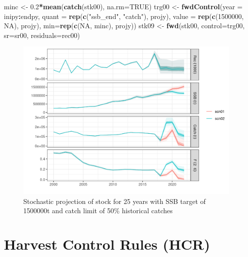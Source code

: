 \documentclass[
]{book}
\newenvironment{Shaded}{\begin{snugshade}}{\end{snugshade}}
\newcommand{\AttributeTok}[1]{\textcolor[rgb]{0.13,0.29,0.53}{#1}}
\newcommand{\ConstantTok}[1]{\textcolor[rgb]{0.56,0.35,0.01}{#1}}
\newcommand{\DecValTok}[1]{\textcolor[rgb]{0.00,0.00,0.81}{#1}}
\newcommand{\FloatTok}[1]{\textcolor[rgb]{0.00,0.00,0.81}{#1}}
\newcommand{\FunctionTok}[1]{\textcolor[rgb]{0.13,0.29,0.53}{\textbf{#1}}}
\newcommand{\NormalTok}[1]{#1}
\newcommand{\OtherTok}[1]{\textcolor[rgb]{0.56,0.35,0.01}{#1}}
\newcommand{\SpecialCharTok}[1]{\textcolor[rgb]{0.81,0.36,0.00}{\textbf{#1}}}
\newcommand{\StringTok}[1]{\textcolor[rgb]{0.31,0.60,0.02}{#1}}
\begin{document}
\begin{Shaded}
\begin{Highlighting}[]
\NormalTok{minc }\OtherTok{\textless{}{-}} \FloatTok{0.2}\SpecialCharTok{*}\FunctionTok{mean}\NormalTok{(}\FunctionTok{catch}\NormalTok{(stk00), }\AttributeTok{na.rm=}\ConstantTok{TRUE}\NormalTok{)}
\NormalTok{trg00 }\OtherTok{\textless{}{-}} \FunctionTok{fwdControl}\NormalTok{(}\AttributeTok{year =}\NormalTok{ inipy}\SpecialCharTok{:}\NormalTok{endpy, }\AttributeTok{quant =} \FunctionTok{rep}\NormalTok{(}\FunctionTok{c}\NormalTok{(}\StringTok{"ssb\_end"}\NormalTok{, }\StringTok{"catch"}\NormalTok{), projy), }\AttributeTok{value =} \FunctionTok{rep}\NormalTok{(}\FunctionTok{c}\NormalTok{(}\DecValTok{1500000}\NormalTok{, }\ConstantTok{NA}\NormalTok{), projy), }\AttributeTok{min=}\FunctionTok{rep}\NormalTok{(}\FunctionTok{c}\NormalTok{(}\ConstantTok{NA}\NormalTok{, minc), projy))}
\NormalTok{stk09 }\OtherTok{\textless{}{-}} \FunctionTok{fwd}\NormalTok{(stk00, }\AttributeTok{control=}\NormalTok{trg00, }\AttributeTok{sr=}\NormalTok{sr00, }\AttributeTok{residuals=}\NormalTok{rec00)}
\end{Highlighting}
\end{Shaded}

\begin{figure}
\centering
\includegraphics{_bookdown_files/_main_files/figure-html/unnamed-chunk-131-1.png}
\caption{\label{fig:unnamed-chunk-131}Stochastic projection of stock for 25 years with SSB target of 1500000t and catch limit of 50\% historical catches}
\end{figure}

\hypertarget{harvest-control-rules-hcr}{%
\section{Harvest Control Rules (HCR)}\label{harvest-control-rules-hcr}}
\end{document}
